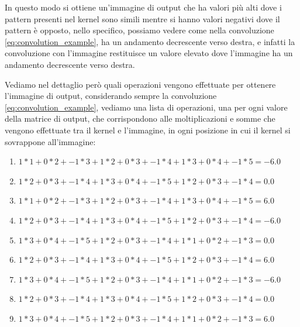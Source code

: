 In questo modo si ottiene un'immagine di output che ha valori più alti dove i pattern 
presenti nel kernel sono simili mentre si hanno valori negativi dove il pattern è opposto, nello specifico,
possiamo vedere come nella convoluzione \ref{eq:convolution_example}, ha un andamento decrescente verso destra, e infatti la convoluzione 
con l'immagine restituisce un valore elevato dove l'immagine ha un andamento decrescente verso destra.

Vediamo nel dettaglio però quali operazioni vengono effettuate per ottenere l'immagine di output, considerando sempre la convoluzione \ref{eq:convolution_example}, vediamo
una lista di operazioni, una per ogni valore della matrice di output, che corrispondono alle moltiplicazioni e somme che vengono effettuate tra il kernel e l'immagine, in ogni
posizione in cui il kernel si sovrappone all'immagine:
\begin{enumerate}
    \item $1*1 + 0*2 + -1*3 + 1*2 + 0*3 + -1*4 + 1*3 + 0*4 + -1*5 = -6.0$
    \item $1*2 + 0*3 + -1*4 + 1*3 + 0*4 + -1*5 + 1*2 + 0*3 + -1*4 = 0.0$
    \item $1*1 + 0*2 + -1*3 + 1*2 + 0*3 + -1*4 + 1*3 + 0*4 + -1*5 = 6.0$
    \item $1*2 + 0*3 + -1*4 + 1*3 + 0*4 + -1*5 + 1*2 + 0*3 + -1*4 = -6.0$
    \item $1*3 + 0*4 + -1*5 + 1*2 + 0*3 + -1*4 + 1*1 + 0*2 + -1*3 = 0.0$
    \item $1*2 + 0*3 + -1*4 + 1*3 + 0*4 + -1*5 + 1*2 + 0*3 + -1*4 = 6.0$
    \item $1*3 + 0*4 + -1*5 + 1*2 + 0*3 + -1*4 + 1*1 + 0*2 + -1*3 = -6.0$
    \item $1*2 + 0*3 + -1*4 + 1*3 + 0*4 + -1*5 + 1*2 + 0*3 + -1*4 = 0.0$
    \item $1*3 + 0*4 + -1*5 + 1*2 + 0*3 + -1*4 + 1*1 + 0*2 + -1*3 = 6.0$
\end{enumerate}


